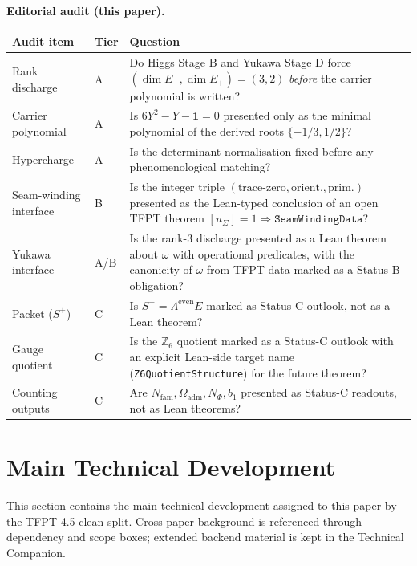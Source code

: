 \documentclass[11pt,a4paper]{article}
\begin{document}
\smallskip
\noindent\textbf{Editorial audit (this paper).}

\begin{center}
\footnotesize
\begin{tabularx}{\textwidth}{@{}p{}p{}Y@{}}
\toprule
\textbf{Audit item} & \textbf{Tier} & \textbf{Question} \\
\midrule
Rank discharge
  & A
  & Do Higgs Stage B and Yukawa Stage D force $(\dim E_-,\dim E_+)=(3,2)$ \emph{before} the carrier polynomial is written? \\
Carrier polynomial
  & A
  & Is $6Y^2-Y-\mathbf 1=0$ presented only as the minimal polynomial of the derived roots
    $\{-1/3, 1/2\}$? \\
Hypercharge
  & A
  & Is the determinant normalisation fixed before any phenomenological matching? \\
Seam-winding interface
  & B
  & Is the integer triple $(\textrm{trace-zero},\textrm{orient.},\textrm{prim.})$ presented as the
    Lean-typed conclusion of an open TFPT theorem
    $[u_\Sigma]=1 \Rightarrow \texttt{SeamWindingData}$? \\
Yukawa interface
  & A/B
  & Is the rank-3 discharge presented as a Lean theorem about $\omega$ with operational
    predicates, with the canonicity of $\omega$ from TFPT data marked as a Status-B obligation? \\
Packet ($S^+$)
  & C
  & Is $S^+=\Lambda^{\mathrm{even}}E$ marked as Status-C outlook, not as a Lean theorem? \\
Gauge quotient
  & C
  & Is the $\mathbb Z_6$ quotient marked as a Status-C outlook with an explicit Lean-side
    target name (\texttt{Z6QuotientStructure}) for the future theorem? \\
Counting outputs
  & C
  & Are $N_{\mathrm{fam}},\Omega_{\mathrm{adm}},N_\Phi,b_1$ presented as Status-C readouts, not
    as Lean theorems? \\
\bottomrule
\end{tabularx}
\end{center}

\clearpage
\section{Main Technical Development}

This section contains the main technical development assigned to this paper by the TFPT 4.5 clean split. Cross-paper background is referenced through dependency and scope boxes; extended backend material is kept in the Technical Companion.
\end{document}
